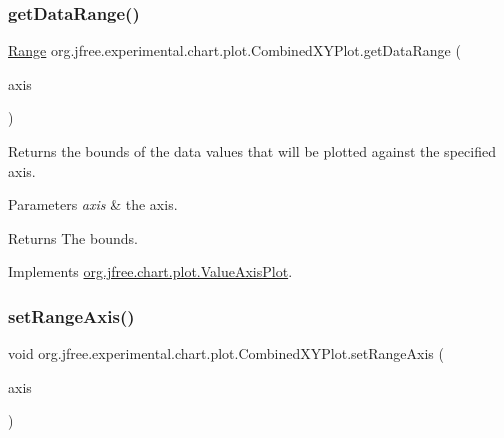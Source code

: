 \subsubsection{\texorpdfstring{get\+Data\+Range()}{getDataRange()}}
{\footnotesize\ttfamily \mbox{\hyperlink{classorg_1_1jfree_1_1data_1_1_range}{Range}} org.\+jfree.\+experimental.\+chart.\+plot.\+Combined\+X\+Y\+Plot.\+get\+Data\+Range (\begin{DoxyParamCaption}\item[{\mbox{\hyperlink{classorg_1_1jfree_1_1chart_1_1axis_1_1_value_axis}{Value\+Axis}}}]{axis }\end{DoxyParamCaption})}

Returns the bounds of the data values that will be plotted against the specified axis.


\begin{DoxyParams}{Parameters}
{\em axis} & the axis.\\
\hline
\end{DoxyParams}
\begin{DoxyReturn}{Returns}
The bounds. 
\end{DoxyReturn}


Implements \mbox{\hyperlink{interfaceorg_1_1jfree_1_1chart_1_1plot_1_1_value_axis_plot_a54815b2f078c11b2618804fe3e7e5353}{org.\+jfree.\+chart.\+plot.\+Value\+Axis\+Plot}}.

\mbox{\label{classorg_1_1jfree_1_1experimental_1_1chart_1_1plot_1_1_combined_x_y_plot_a310eec01cdf4a90b7ceef044e748d9bb}} 
\subsubsection{\texorpdfstring{set\+Range\+Axis()}{setRangeAxis()}}
{\footnotesize\ttfamily void org.\+jfree.\+experimental.\+chart.\+plot.\+Combined\+X\+Y\+Plot.\+set\+Range\+Axis (\begin{DoxyParamCaption}\item[{\mbox{\hyperlink{classorg_1_1jfree_1_1chart_1_1axis_1_1_value_axis}{Value\+Axis}}}]{axis }\end{DoxyParamCaption})}

